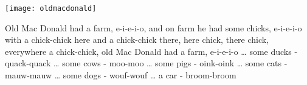 \begin{intersong}
    \texttt{[image: oldmacdonald]}
\end{intersong}
\beginverse*
Old Mac Donald had a farm, e-i-e-i-o,
and on farm he had some chicks, e-i-e-i-o
with a chick-chick here and a chick-chick there,
here chick, there chick,
everywhere a chick-chick,
old Mac Donald had a farm, e-i-e-i-o
\endverse
\beginverse*
… some ducks - quack-quack
… some cows - moo-moo
… some pigs - oink-oink
… some cats - mauw-mauw
… some dogs - wouf-wouf
… a car - broom-broom
\endverse
\endsong 